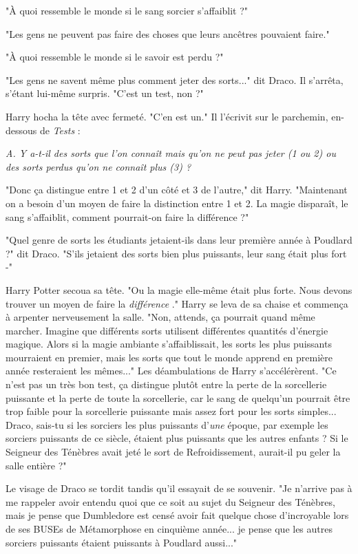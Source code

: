 "À quoi ressemble le monde si le sang sorcier s'affaiblit ?"

"Les gens ne peuvent pas faire des choses que leurs ancêtres pouvaient faire."

"À quoi ressemble le monde si le savoir est perdu ?"

"Les gens ne savent même plus comment jeter des sorts..." dit Draco. Il s'arrêta, s'étant lui-même surpris. "C'est un test, non ?"

Harry hocha la tête avec fermeté. "C'en est un." Il l'écrivit sur le parchemin, en-dessous de \emph{Tests}  :

\emph{A. Y a-t-il des sorts que l'on connaît mais qu'on ne peut pas jeter (1 ou 2) ou des sorts perdus qu'on ne connaît plus (3) ?} 

"Donc ça distingue entre 1 et 2 d'un côté et 3 de l'autre," dit Harry. "Maintenant on a besoin d'un moyen de faire la distinction entre 1 et 2. La magie disparaît, le sang s'affaiblit, comment pourrait-on faire la différence ?"

"Quel genre de sorts les étudiants jetaient-ils dans leur première année à Poudlard ?" dit Draco. "S'ils jetaient des sorts bien plus puissants, leur sang était plus fort -"

Harry Potter secoua sa tête. "Ou la magie elle-même était plus forte. Nous devons trouver un moyen de faire la \emph{différence} ." Harry se leva de sa chaise et commença à arpenter nerveusement la salle. "Non, attends, ça pourrait quand même marcher. Imagine que différents sorts utilisent différentes quantités d'énergie magique. Alors si la magie ambiante s'affaiblissait, les sorts les plus puissants mourraient en premier, mais les sorts que tout le monde apprend en première année resteraient les mêmes..." Les déambulations de Harry s'accélérèrent. "Ce n'est pas un très bon test, ça distingue plutôt entre la perte de la sorcellerie puissante et la perte de toute la sorcellerie, car le sang de quelqu'un pourrait être trop faible pour la sorcellerie puissante mais assez fort pour les sorts simples... Draco, sais-tu si les sorciers les plus puissants d'\emph{une}  époque, par exemple les sorciers puissants de ce siècle, étaient plus puissants que les autres enfants ? Si le Seigneur des Ténèbres avait jeté le sort de Refroidissement, aurait-il pu geler la salle entière ?"

Le visage de Draco se tordit tandis qu'il essayait de se souvenir. "Je n'arrive pas à me rappeler avoir entendu quoi que ce soit au sujet du Seigneur des Ténèbres, mais je pense que Dumbledore est censé avoir fait quelque chose d'incroyable lors de ses BUSEs de Métamorphose en cinquième année... je pense que les autres sorciers puissants étaient puissants à Poudlard aussi..."

